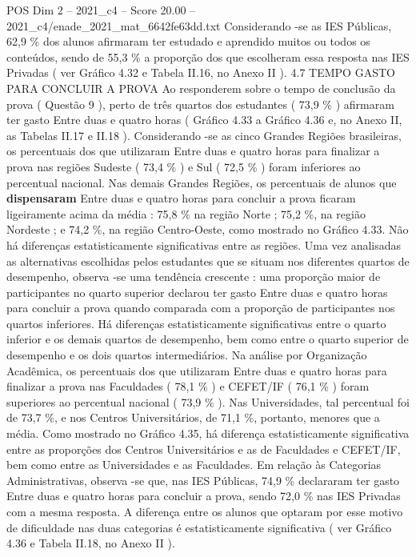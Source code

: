 \begin{textsample}{POS Dim 2 – 2021\_c4 – Score 20.00 – 2021\_c4/enade\_2021\_mat\_6642fe63dd.txt}
Considerando -se as IES Públicas, 62,9 \% dos alunos afirmaram ter estudado e aprendido muitos ou todos os conteúdos, sendo de 55,3 \% a proporção dos que escolheram essa resposta nas IES Privadas ( ver Gráfico 4.32 e Tabela II.16, no Anexo II ). 4.7 TEMPO GASTO PARA CONCLUIR A PROVA Ao responderem sobre o tempo de conclusão da prova ( Questão 9 ), perto de três quartos dos estudantes ( 73,9 \% ) afirmaram ter gasto Entre duas e quatro horas ( Gráfico 4.33 a Gráfico 4.36 e, no Anexo II, as Tabelas II.17 e II.18 ).
Considerando -se as cinco Grandes Regiões brasileiras, os percentuais dos que utilizaram Entre duas e quatro horas para finalizar a prova nas regiões Sudeste ( 73,4 \% ) e Sul ( 72,5 \% ) foram inferiores ao percentual nacional.
Nas demais Grandes Regiões, os percentuais de alunos que \textbf{dispensaram} Entre duas e quatro horas para concluir a prova ficaram ligeiramente acima da média : 75,8 \% na região Norte ; 75,2 \%, na região Nordeste ; e 74,2 \%, na região Centro-Oeste, como mostrado no Gráfico 4.33.
Não há diferenças estatisticamente significativas entre as regiões.
Uma vez analisadas as alternativas escolhidas pelos estudantes que se situam nos diferentes quartos de desempenho, observa -se uma tendência crescente : uma proporção maior de participantes no quarto superior declarou ter gasto Entre duas e quatro horas para concluir a prova quando comparada com a proporção de participantes nos quartos inferiores.
Há diferenças estatisticamente significativas entre o quarto inferior e os demais quartos de desempenho, bem como entre o quarto superior de desempenho e os dois quartos intermediários.
Na análise por Organização Acadêmica, os percentuais dos que utilizaram Entre duas e quatro horas para finalizar a prova nas Faculdades ( 78,1 \% ) e CEFET/IF ( 76,1 \% ) foram superiores ao percentual nacional ( 73,9 \% ).
Nas Universidades, tal percentual foi de 73,7 \%, e nos Centros Universitários, de 71,1 \%, portanto, menores que a média.
Como mostrado no Gráfico 4.35, há diferença estatisticamente significativa entre as proporções dos Centros Universitários e as de Faculdades e CEFET/IF, bem como entre as Universidades e as Faculdades.
Em relação às Categorias Administrativas, observa -se que, nas IES Públicas, 74,9 \% declararam ter gasto Entre duas e quatro horas para concluir a prova, sendo 72,0 \% nas IES Privadas com a mesma resposta.
A diferença entre os alunos que optaram por esse motivo de dificuldade nas duas categorias é estatisticamente significativa ( ver Gráfico 4.36 e Tabela II.18, no Anexo II ).

\end{textsample}
